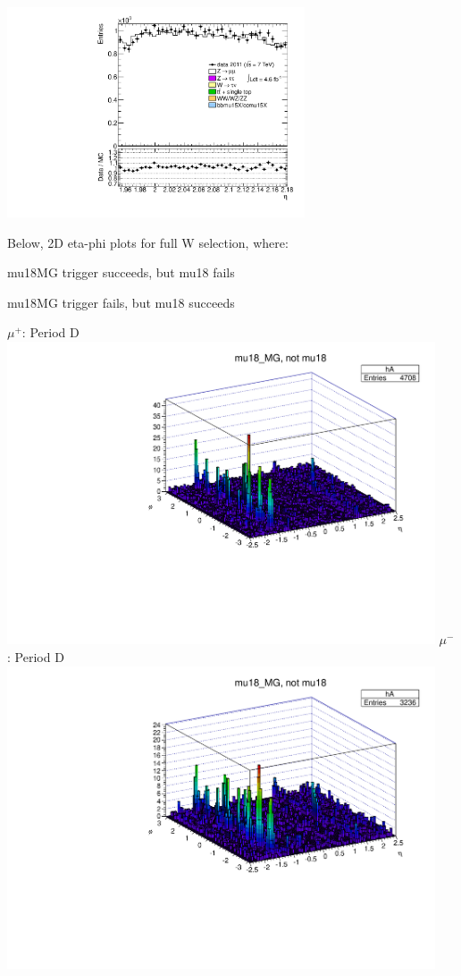 {\includegraphics[width=0.66\textwidth]{dates/20130306/figures/mu18/ZMU18_10_A_stack_lN_eta_ALL.pdf} 
\cole
}

 {
 Below, 2D eta-phi plots for full W selection, where:
 \iteb
 \item mu18MG trigger succeeds, but mu18 fails
 \item mu18MG trigger fails, but mu18 succeeds
 \itee
}
 {
\colb[T]
$\mu^+$: Period D
\centering
\includegraphics[width=0.95\textwidth]{dates/20130306/figures/mu18/dump_MG_dataD_w_POS.dat__MG_NOT_MUID}
$\mu^-$: Period D
\centering
\includegraphics[width=0.95\textwidth]{dates/20130306/figures/mu18/dump_MG_dataD_w_NEG.dat__MG_NOT_MUID}
\cole
}
